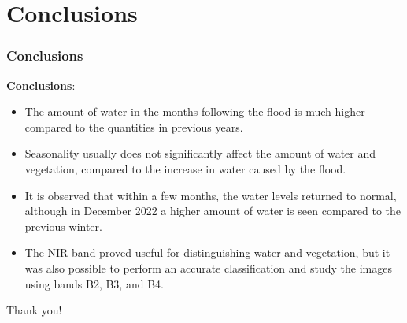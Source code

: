 \documentclass{beamer}
\begin{document}
\section{Conclusions}
\begin{frame}
  \frametitle{\small Conclusions}
  
    \small \textbf{Conclusions}:
    \begin{itemize}
        \item \small The amount of water in the months following the flood is much higher compared to the quantities in previous years. 
        \item \small Seasonality usually does not significantly affect the amount of water and vegetation, compared to the increase in water caused by the flood. 
        \item \small It is observed that within a few months, the water levels returned to normal, although in December 2022 a higher amount of water is seen compared to the previous winter. 
        \item \small The NIR band proved useful for distinguishing water and vegetation, but it was also possible to perform an accurate classification and study the images using bands B2, B3, and B4.
    \end{itemize}
  
\end{frame}

\begin{frame}
 \centering\huge Thank you!    
\end{frame}
\end{document}
